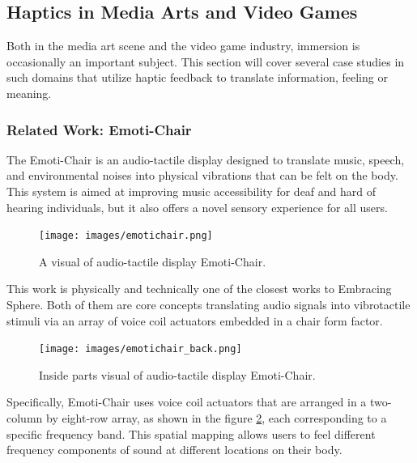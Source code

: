         \subsection{Haptics in Media Arts and Video Games}
            Both in the media art scene and the video game industry, immersion is occasionally an important subject. This section will cover several case studies in such domains that utilize haptic feedback to translate information, feeling or meaning.\par
            
            \subsubsection{Related Work: Emoti-Chair}
                The Emoti-Chair is an audio-tactile display designed to translate music, speech, and environmental noises into physical vibrations that can be felt on the body. This system is aimed at improving music accessibility for deaf and hard of hearing individuals, but it also offers a novel sensory experience for all users\cite{Emoti-Chair}.\par

                \begin{figure}[H]
                    \centering
                    \texttt{[image: images/emotichair.png]}
                    \caption{A visual of audio-tactile display Emoti-Chair.}
                    \label{fig:EMOTICHAIR}
                \end{figure}

                This work is physically and technically one of the closest works to Embracing Sphere. Both of them are core concepts translating audio signals into vibrotactile stimuli via an array of voice coil actuators embedded in a chair form factor.\par

                \begin{figure}[H]
                    \centering
                    \texttt{[image: images/emotichair\_back.png]}
                    \caption{Inside parts visual of audio-tactile display Emoti-Chair.}
                    \label{fig:EMOTICHAIR_BACK}
                \end{figure}

                Specifically, Emoti-Chair uses voice coil actuators that are arranged in a two-column by eight-row array, as shown in the figure \ref{fig:EMOTICHAIR_BACK}, each corresponding to a specific frequency band. This spatial mapping allows users to feel different frequency components of sound at different locations on their body.\par

